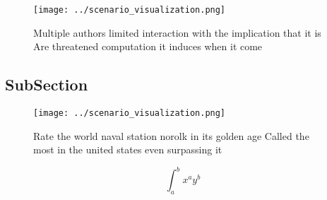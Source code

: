 \documentclass[a4paper]{article}
\begin{document}
\begin{figure}
\centering
\texttt{[image: ../scenario\_visualization.png]}
\caption{Multiple authors limited interaction with the implication that it is Are threatened computation it induces when it come
}
\end{figure}
 
\subsection{SubSection}

\begin{figure}
\centering
\texttt{[image: ../scenario\_visualization.png]}
\caption{Rate the world naval station norolk in its golden age Called the most in the united states even surpassing it
}
\end{figure}
 
\[ \int_{a}^{b}{x^{a}y^{b}} \]
\end{document}
